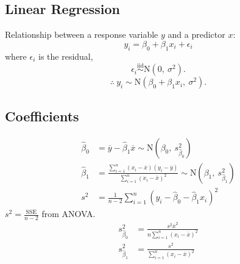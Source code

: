\documentclass{article}
\begin{document}
\begin{multicols}{3}
    \section{Linear Regression}
    Relationship between a response variable \(y\) and a predictor \(x\):
    \begin{equation*}
        y_i = \beta_0 + \beta_1 x_i + \epsilon_i
    \end{equation*}
    where \(\epsilon_i\) is the residual,
    \begin{equation*}
        \epsilon_i \overset{\mathrm{iid}}{\sim} \mathrm{N}\left( 0,\: \sigma^2 \right).
    \end{equation*}
    \begin{equation*}
        \therefore \ y_i \sim \mathrm{N}\left( \beta_0 + \beta_1 x_i,\: \sigma^2 \right).
    \end{equation*}
    \subsection{Coefficients}
    \begin{align*}
        \hat{\beta}_0 & = \overline{y} - \hat{\beta}_1 \overline{x}                                                                                                     \sim \mathrm{N}\left( \beta_0,\: s^2_{\hat{\beta}_0} \right)  \\
        \hat{\beta}_1 & = \tfrac{\sum_{i = 1}^n \left( x_i - \overline{x} \right) \left( y_i - \overline{y} \right)}{\sum_{i = 1}^n \left( x_i - \overline{x} \right)^2} \sim \mathrm{N}\left( \beta_1,\: s^2_{\hat{\beta}_1} \right) \\
        s^2           & = \frac{1}{n - 2} \sum_{i = 1}^n \left( y_i - \hat{\beta}_0 - \hat{\beta}_1 x_i \right)^2
    \end{align*}
    \(s^2 = \frac{\mathrm{SSE}}{n - 2}\) from ANOVA\@.
    \begin{align*}
        s^2_{\hat{\beta}_0} & = \frac{s^2 \overline{x}^2}{n \sum_{i = 1}^n \left( x_i - \overline{x} \right)^2} \\
        s^2_{\hat{\beta}_1} & = \frac{s^2}{\sum_{i = 1}^n \left( x_i - \overline{x} \right)^2}
    \end{align*}

\end{multicols}
\end{document}
